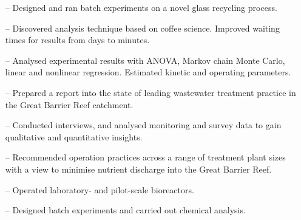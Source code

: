 \documentclass[10pt,a4paper]{altacv}
\begin{document}
\begin{itemize}
    \setlength{\itemindent}{0.3em}
    \item[--]   \small{Designed and ran batch experiments on a novel glass 
    recycling process.}
    \item[--]   \small{Discovered analysis technique based on 
    coffee science. Improved waiting times for results from days to minutes.}
    \item[--]   \small{Analysed experimental results with ANOVA, Markov chain Monte
    Carlo, linear and nonlinear regression. Estimated kinetic and operating parameters.}
\end{itemize}
\divider\smallskip

\begin{itemize}
    \setlength{\itemindent}{0.3em}
    \item[--]   \small{Prepared a report into the state of leading 
    wastewater treatment practice in the Great Barrier Reef catchment.}
    \item[--]   \small{Conducted interviews, and analysed monitoring 
    and survey data to gain qualitative and quantitative insights.}
    \item[--]   \small{Recommended operation practices across a 
    range of treatment plant sizes with a view to minimise
    nutrient discharge into the Great Barrier Reef.}
\end{itemize}
\divider\smallskip


\begin{itemize}
    \setlength{\itemindent}{0.3em}
    \item[--]   \small{Operated laboratory- and pilot-scale bioreactors.}
    \item[--]   \small{Designed batch experiments and carried out chemical
    analysis.}
\end{itemize}

\divider\medskip

\newpage
\end{document}
